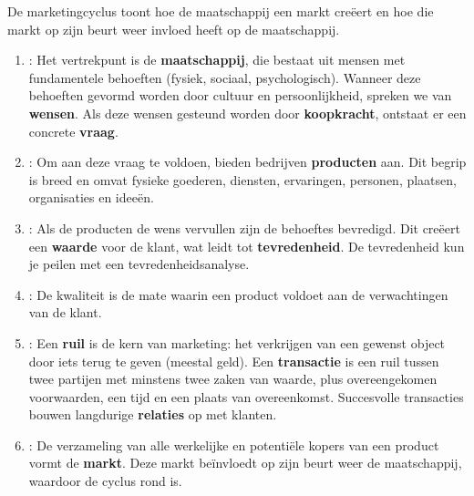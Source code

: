 \documentclass[a4paper,11pt]{article}
\begin{document}
De marketingcyclus toont hoe de maatschappij een markt creëert en hoe die markt op zijn beurt weer invloed heeft op de maatschappij.

\begin{enumerate}
    \item {}: Het vertrekpunt is de \textbf{maatschappij},
          die bestaat uit mensen met fundamentele behoeften (fysiek, sociaal, psychologisch).
          Wanneer deze behoeften gevormd worden door cultuur en persoonlijkheid, spreken we van \textbf{wensen}.
          Als deze wensen gesteund worden door \textbf{koopkracht}, ontstaat er een concrete \textbf{vraag}.
    \item {}: Om aan deze vraag te voldoen, bieden bedrijven \textbf{producten} aan.
          Dit begrip is breed en omvat fysieke goederen, diensten, ervaringen, personen, plaatsen, organisaties en ideeën.
    \item {}:
          Als de producten de wens vervullen zijn de behoeftes bevredigd.
          Dit creëert een \textbf{waarde} voor de klant, wat leidt tot \textbf{tevredenheid}.
          De tevredenheid kun je peilen met een tevredenheidsanalyse.
    \item {}:
          De kwaliteit is de mate waarin een product voldoet aan de verwachtingen van de klant.

    \item {}: Een \textbf{ruil} is de kern van marketing: het verkrijgen
          van een gewenst object door iets terug te geven (meestal geld).
          Een \textbf{transactie} is een ruil tussen twee partijen met minstens twee zaken van waarde, plus overeengekomen voorwaarden, een tijd en een plaats van overeenkomst. Succesvolle transacties bouwen langdurige \textbf{relaties} op met klanten.
    \item {}: De verzameling van alle werkelijke en potentiële kopers van een product vormt de
          \textbf{markt}. Deze markt beïnvloedt op zijn beurt weer de maatschappij, waardoor de cyclus rond is.
\end{enumerate}
\end{document}
